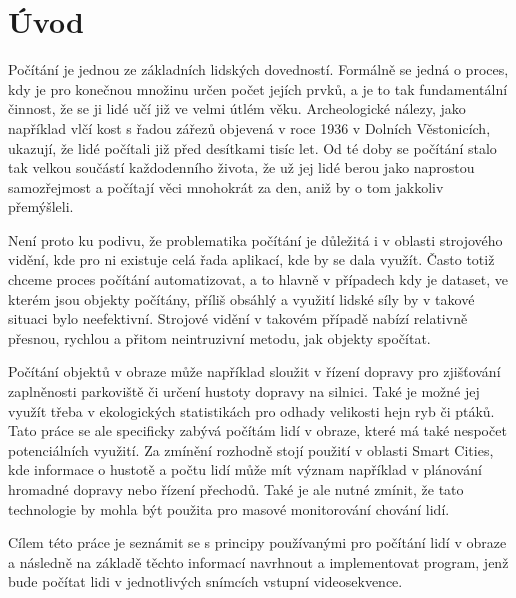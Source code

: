 \chapter{Úvod}
\label{sec:Introduction}
Počítání je jednou ze základních lidských dovedností. Formálně se jedná o proces, kdy je pro konečnou množinu určen počet jejích prvků, a je to tak fundamentální činnost, že se ji lidé učí již ve velmi útlém věku.
Archeologické nálezy, jako například vlčí kost s řadou zářezů objevená v roce 1936 v Dolních Věstonicích, ukazují, že lidé počítali již před desítkami tisíc let.
Od té doby se počítání stalo tak velkou součástí každodenního života, že už jej lidé berou jako naprostou samozřejmost a počítají věci mnohokrát za den, aniž by o tom jakkoliv přemýšleli.

Není proto ku podivu, že problematika počítání je důležitá i v oblasti strojového vidění, kde pro ni existuje celá řada aplikací, kde by se dala využít.
Často totiž chceme proces počítání automatizovat, a to hlavně v případech kdy je dataset, ve kterém jsou objekty počítány, příliš obsáhlý a využití lidské síly by v takové situaci bylo neefektivní.
Strojové vidění v takovém případě nabízí relativně přesnou, rychlou a přitom neintruzivní metodu, jak objekty spočítat.

Počítání objektů v obraze může například sloužit v řízení dopravy pro zjišťování zaplněnosti parkoviště či určení hustoty dopravy na silnici. Také je možné jej využít třeba v ekologických statistikách pro odhady velikosti hejn ryb či ptáků.
Tato práce se ale specificky zabývá počítám lidí v obraze, které má také nespočet potenciálních využití.
Za zmínění rozhodně stojí použití v oblasti Smart Cities, kde informace o hustotě a počtu lidí může mít význam například v plánování hromadné dopravy nebo řízení přechodů.
Také je ale nutné zmínit, že tato technologie by mohla být použita pro masové monitorování chování lidí.

Cílem této práce je seznámit se s principy používanými pro počítání lidí v obraze a následně na základě těchto informací navrhnout a implementovat program, jenž bude počítat lidi v jednotlivých snímcích vstupní videosekvence.


\endinput